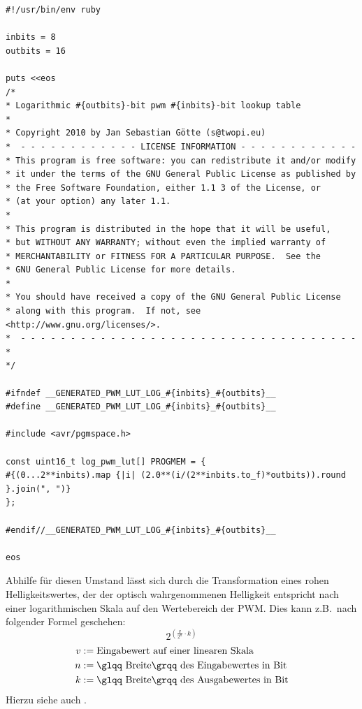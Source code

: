 \documentclass[12pt,a4paper,notitlepage]{article}
\begin{document}
\begin{verbatim}
#!/usr/bin/env ruby

inbits = 8
outbits = 16

puts <<eos
/* 
* Logarithmic #{outbits}-bit pwm #{inbits}-bit lookup table
* 
* Copyright 2010 by Jan Sebastian Götte (s@twopi.eu)
*  - - - - - - - - - - - - LICENSE INFORMATION - - - - - - - - - - - -
* This program is free software: you can redistribute it and/or modify
* it under the terms of the GNU General Public License as published by
* the Free Software Foundation, either 1.1 3 of the License, or
* (at your option) any later 1.1.
* 
* This program is distributed in the hope that it will be useful,
* but WITHOUT ANY WARRANTY; without even the implied warranty of
* MERCHANTABILITY or FITNESS FOR A PARTICULAR PURPOSE.  See the
* GNU General Public License for more details.
* 
* You should have received a copy of the GNU General Public License
* along with this program.  If not, see <http://www.gnu.org/licenses/>.
*  - - - - - - - - - - - - - - - - - - - - - - - - - - - - - - - - - -
*
*/

#ifndef __GENERATED_PWM_LUT_LOG_#{inbits}_#{outbits}__
#define __GENERATED_PWM_LUT_LOG_#{inbits}_#{outbits}__

#include <avr/pgmspace.h>

const uint16_t log_pwm_lut[] PROGMEM = {
#{(0...2**inbits).map {|i| (2.0**(i/(2**inbits.to_f)*outbits)).round }.join(", ")}
};

#endif//__GENERATED_PWM_LUT_LOG_#{inbits}_#{outbits}__

eos
\end{verbatim}

Abhilfe für diesen Umstand lässt sich durch die Transformation eines rohen Helligkeitswertes, der der optisch wahrgenommenen Helligkeit entspricht nach einer logarithmischen Skala auf den Wertebereich der \gls{PWM}. Dies kann z.B.\ nach folgender Formel geschehen:
\begin{equation}
2^{\left(\frac{v}{2^n}\cdot k\right)}
\end{equation}
\begin{align}
v&:=\text{Eingabewert auf einer linearen Skala}\\
n&:=\text{\glqq Breite\grqq\ des Eingabewertes in Bit}\\
k&:=\text{\glqq Breite\grqq\  des Ausgabewertes in Bit}
\end{align}
Hierzu siehe auch \cite{MAXIM41,MAXIM57,SIART1}.
\end{document}
